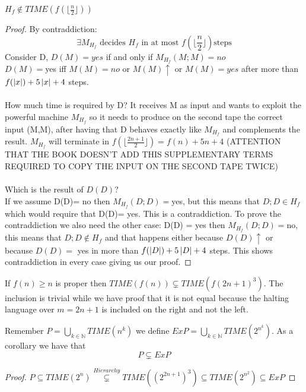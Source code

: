\begin{lemma}
    $H_f \notin TIME(f(\lfloor \frac{n}{2}\rfloor))$
    \begin{proof}
        By contraddiction:
        \[ 
            \exists M_{H_f} \text{ decides } H_f \text{ in at most } f(\lfloor \frac{n}{2}\rfloor) \text{steps}
        \]
        Consider D, $D(M) = yes$ if and only if $M_{H_f}(M;M) = no$\\
        $D(M) = $yes iff $M(M) = no$ or $M(M)\uparrow$ or $M(M)=yes$ after more than $f(\left\lvert x\right\rvert)+5\left\lvert x\right\rvert+4$ steps.\\\\ How much time is required by D? It receives M as input and wants to exploit the powerful machine $M_{H_f}$ so it needs to produce on the second tape the correct input (M,M), after having that D behaves exactly like $M_{H_f}$ and complements the result. $M_{H_f}$ will terminate in $f(\lfloor\frac{2n+1}{2}\rfloor) = f(n)+5n+4$ (ATTENTION THAT THE BOOK DOESN'T ADD THIS SUPPLEMENTARY TERMS REQUIRED TO COPY THE INPUT ON THE SECOND TAPE TWICE)\\\\
        Which is the result of $D(D)$?\\
        If we assume D(D)= no then $M_{H_f}(D;D) = $yes, but this means that $D;D \in H_f$ which would require that D(D)= yes. This is a contraddiction. To prove the contraddiction we also need the other case: D(D) = yes then $M_{H_f}(D;D) =$no, this means that $D;D \notin H_f$ and that happens either because $D(D)\uparrow$ or because $D(D) = $ yes in more than $f(\left\lvert D\right\rvert)+5\left\lvert D\right\rvert+4 $ steps. This shows contraddiction in every case giving us our proof.
    \end{proof}
\end{lemma}
\begin{theorem}[Hierarchy]
    If $f(n)\geq n$ is proper then $TIME(f(n)) \subsetneq TIME(f(2n+1)^3)$. The inclusion is trivial while we have proof that it is not equal because the halting language over $m = 2n+1$ is included on the right and not the left. 
\end{theorem}
Remember $P = \bigcup_{k\in \mathbb{N}}{TIME(n^k)}$ we define $ExP = \bigcup_{k\in \mathbb{N}}{TIME(2^{n^k})}$. As a corollary we have that \[ 
    P \subsetneq ExP 
\]
\begin{proof}
    $P\subseteq TIME(2^n) \overset{Hierarchy}{\subsetneq} TIME((2^{2n+1})^3) \subseteq TIME(2^{n^2}) \subseteq ExP$
\end{proof}
